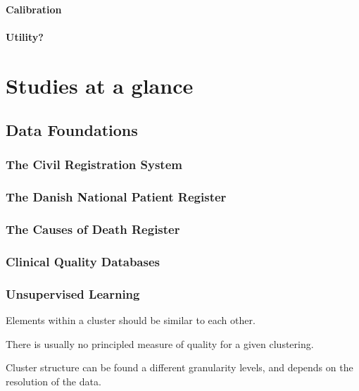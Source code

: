 \subsection{Calibration}
\subsection{Utility?}

\part{Studies at a glance}
\chapter{Data Foundations}
\section{The Civil Registration System}
\section{The Danish National Patient Register}
\section{The Causes of Death Register}
\section{Clinical Quality Databases}


\section{Unsupervised Learning}

Elements within a cluster should be similar to each other.

There is usually no principled measure of quality
for a given clustering.

Cluster structure can be found a different granularity levels,
and depends on the resolution of the data.
